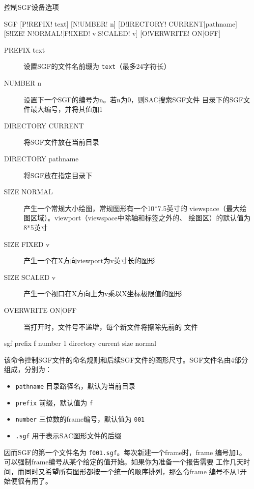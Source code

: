 \label{cmd:sgf}

控制SGF设备选项

\begin{SACSTX}
SGF [P!REFIX! text] [N!UMBER! n] [D!IRECTORY! CURRENT|pathname]
    [S!IZE! N!ORMAL!|F!IXED! v|S!CALED! v] [O!VERWRITE! ON|OFF]
\end{SACSTX}

\begin{description}
\item [PREFIX text] 设置SGF的文件名前缀为 \texttt{text}（最多24字符长）
\item [NUMBER n] 设置下一个SGF的编号为n。若n为0，则SAC搜索SGF文件
    目录下的SGF文件最大编号，并将其值加1
\item [DIRECTORY CURRENT] 将SGF文件放在当前目录
\item [DIRECTORY pathname] 将SGF放在指定目录下
\item [SIZE NORMAL] 产生一个常规大小绘图，常规图形有一个10*7.5英寸的
    viewspace（最大绘图区域）。viewport（viewspace中除轴和标签之外的、
    绘图区）的默认值为8*5英寸
\item [SIZE FIXED v] 产生一个在X方向viewport为v英寸长的图形
\item [SIZE SCALED v] 产生一个视口在X方向上为v乘以X坐标极限值的图形
\item [OVERWRITE ON|OFF] 当打开时，文件号不递增，每个新文件将擦除先前的
    文件
\end{description}

\begin{SACDFT}
sgf prefix f number 1 directory current size normal
\end{SACDFT}

该命令控制SGF文件的命名规则和后续SGF文件的图形尺寸。SGF文件名由4部分
组成，分别为：
\begin{itemize}
\item \texttt{pathname} 目录路径名，默认为当前目录
\item \texttt{prefix} 前缀，默认值为 \texttt{f}
\item \texttt{number} 三位数的frame编号，默认值为 \texttt{001}
\item \texttt{.sgf} 用于表示SAC图形文件的后缀
\end{itemize}
因而SGF的第一个文件名为 \texttt{f001.sgf}。每次新建一个frame时，frame
编号加1。可以强制frame编号从某个给定的值开始。如果你为准备一个报告需要
工作几天时间，而同时又希望所有图形都按一个统一的顺序排列，那么令frame
编号不从1开始便很有用了。

